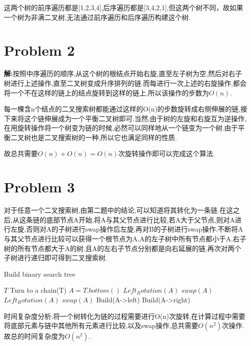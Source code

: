 \documentclass[12pt,a4paper,fontset=none]{ctexart}
\begin{document}
这两个树的前序遍历都是[1,2,3,4],后序遍历都是[3,4,2,1],但这两个树不同，故如果一个树为非满二叉树,无法通过前序遍历和后序遍历构建这个树.
\section*{Problem 2}
\textbf{解:}按照中序遍历的顺序,从这个树的根结点开始右旋,直至左子树为空,然后对右子树进行上述操作,直至二叉树变成升序排列的链.而每进行一次上述的右旋操作,都会将一个不在这样的链上的结点旋转到这样的链上,所以该操作的步数为$O(n)$.

每一棵含n个结点的二叉搜索树都能通过这样的O(n)的步数旋转成右侧伸展的链,接下来将这个链伸展成为一个平衡二叉树即可.当然,由于树的左旋和右旋互为逆操作,在用旋转操作将一个树变为链的时候,必然可以同样地从一个链变为一个树.由于平衡二叉树也是二叉搜索树的一种,所以它也满足同样的性质.

故总共需要$O(n)+O(n)=O(n)$次旋转操作即可以完成这个算法.
\section*{Problem 3}
对于任意一个二叉搜索树,由第二题中的结论,可以知道将其转化为一条链.在这之后,从这条链的底部节点A开始,将A与其父节点进行比较,若A大于父节点,则对A进行左旋,否则对A的子树进行swap操作后左旋,再对B的子树进行swap操作.不断将A与其父节点进行比较可以获得一个根节点为A,A的左子树中所有节点都小于A,右子树的所有节点都大于A的树.且A的左右子节点分别都是向右延展的链,再次对两个子树进行递归即可得到二叉搜索树.

\begin{algorithm}
	\renewcommand{\algorithmicensure}{\textbf{Output:}}
	\renewcommand{\algorithmicrequire}{\textbf{Input:}}
	\caption{Build binary search tree}
	\label{alg2}
	\begin{algorithmic}
		\Require$T$
		\State Turn to a chain(T)
		\Return
		\Else
		\State $A=T.bottom()$
		\State $Left_Rotation(A)$
		\Else
		\State $swap(A)$
		\State 	$Left_Rotation(A)$
		\State $swap(A)$
		\EndIf
		\EndWhile
		\State Build(A->left)
		\State Build(A->right)
		\EndIf
		\EndFunction
	\end{algorithmic}
\end{algorithm}
时间复杂度分析:将一个树转化为链的过程需要进行O(n)次旋转,在计算过程中需要将底部元素与链中其他所有元素进行比较,以及swap操作,总共需要$O(n^2)$次操作.故总的时间复杂度为$O(n^2)$.
\end{document}
